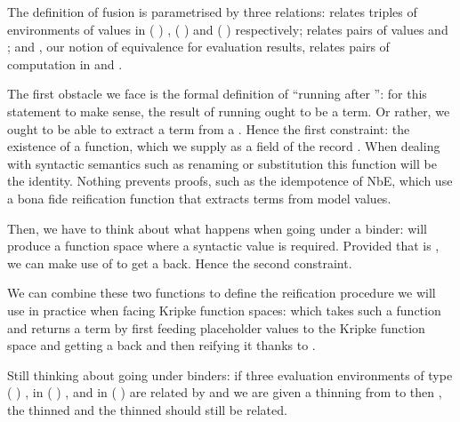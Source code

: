 The definition of fusion is parametrised by three relations:  relates
triples of environments of values in {( )  },
{( )  } and {( )  }
respectively;  relates pairs of values  and ;
and , our notion of equivalence for evaluation results, relates pairs
of computation in  and .


The first obstacle we face is the formal definition of ``running 
after '': for this statement to make sense, the result of running
 ought to be a term. Or rather, we ought to be able to extract a
term from a . Hence the first constraint: the existence of a
 function, which we supply as a field of the record .
When dealing with syntactic semantics such as renaming or substitution
this function will be the identity. Nothing prevents proofs, such as the
idempotence of NbE, which use a bona fide reification function that extracts
terms from model values.


Then, we have to think about what happens when going under a binder: 
will produce a  function space where a syntactic value is required.
Provided that  is , we can make use of  to get a
 back. Hence the second constraint.


We can combine these two functions to define the reification procedure we will
use in practice when facing Kripke function spaces:  which takes such
a function and returns a term by first feeding placeholder values to the Kripke
function space and getting a  back and then reifying it thanks to .


Still thinking about going under binders: if three evaluation environments
 of type
{( )  }, 
in {( )  },
and  in {( )  }
are related by  and we are
given a thinning  from  to  then ,
the thinned  and the
thinned  should still be related.

